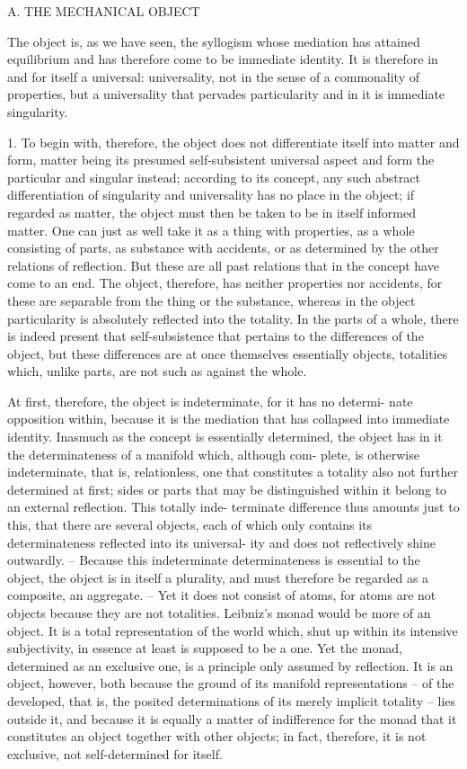 
A. THE MECHANICAL OBJECT

The object is, as we have seen, the syllogism
whose mediation has attained equilibrium
and has therefore come to be immediate identity.
It is therefore in and for itself a universal: universality,
not in the sense of a commonality of properties,
but a universality that pervades particularity
and in it is immediate singularity.

1. To begin with, therefore, the object does not differentiate itself into
matter and form, matter being its presumed self-subsistent universal aspect
and form the particular and singular instead; according to its concept,
any such abstract differentiation of singularity and universality has no place
in the object; if regarded as matter, the object must then be taken to be in
itself informed matter. One can just as well take it as a thing with properties,
as a whole consisting of parts, as substance with accidents, or as determined
by the other relations of reflection. But these are all past relations that in the
concept have come to an end. The object, therefore, has neither properties
nor accidents, for these are separable from the thing or the substance,
whereas in the object particularity is absolutely reflected into the totality.
In the parts of a whole, there is indeed present that self-subsistence that
pertains to the differences of the object, but these differences are at once
themselves essentially objects, totalities which, unlike parts, are not such
as against the whole.

At first, therefore, the object is indeterminate, for it has no determi-
nate opposition within, because it is the mediation that has collapsed into
immediate identity. Inasmuch as the concept is essentially determined, the
object has in it the determinateness of a manifold which, although com-
plete, is otherwise indeterminate, that is, relationless, one that constitutes
a totality also not further determined at first; sides or parts that may be
distinguished within it belong to an external reflection. This totally inde-
terminate difference thus amounts just to this, that there are several objects,
each of which only contains its determinateness reflected into its universal-
ity and does not reflectively shine outwardly. – Because this indeterminate
determinateness is essential to the object, the object is in itself a plurality,
and must therefore be regarded as a composite, an aggregate. – Yet it does not
consist of atoms, for atoms are not objects because they are not totalities.
Leibniz's monad would be more of an object. It is a total representation
of the world which, shut up within its intensive subjectivity, in essence at
least is supposed to be a one. Yet the monad, determined as an exclusive
one, is a principle only assumed by reflection. It is an object, however, both
because the ground of its manifold representations – of the developed, that
is, the posited determinations of its merely implicit totality – lies outside
it, and because it is equally a matter of indifference for the monad that it
constitutes an object together with other objects; in fact, therefore, it is not
exclusive, not self-determined for itself.

